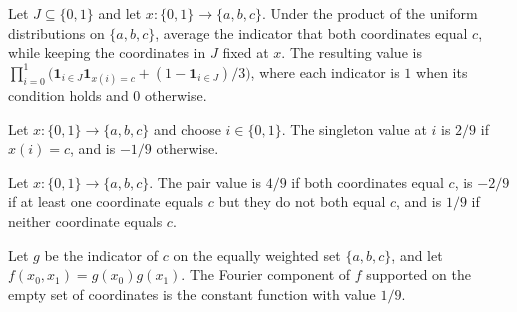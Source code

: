 \begin{theorem}
\label{FABL.projectOnCoordinates_threePointBothCIndicator}
\leanok
{}
Let $J\subseteq\{0,1\}$ and let $x:\{0,1\}\to\{a,b,c\}$. Under the product of the
uniform distributions on $\{a,b,c\}$, average the indicator that both coordinates equal
$c$, while keeping the coordinates in $J$ fixed at $x$. The resulting value is
$\prod_{i=0}^{1}\bigl(\mathbf{1}_{i\in J}\mathbf{1}_{x(i)=c}+(1-\mathbf{1}_{i\in
J})/3\bigr)$, where each indicator is $1$ when its condition holds and $0$ otherwise.
\end{theorem}

\begin{definition}
\label{FABL.threePointSingletonOrthogonalValue}
\leanok
{}
Let $x\colon\{0,1\}\to\{a,b,c\}$ and choose $i\in\{0,1\}$. The singleton value at $i$ is
$2/9$ if $x(i)=c$, and is $-1/9$ otherwise.
\end{definition}

\begin{definition}
\label{FABL.threePointPairOrthogonalValue}
\leanok
{}
Let $x\colon\{0,1\}\to\{a,b,c\}$. The pair value is $4/9$ if both coordinates equal $c$,
is $-2/9$ if at least one coordinate equals $c$ but they do not both equal $c$, and is
$1/9$ if neither coordinate equals $c$.
\end{definition}

\begin{theorem}
\label{FABL.threePointBothCIndicator_orthogonalComponent_empty}
\leanok
{}
Let $g$ be the indicator of $c$ on the equally weighted set $\{a,b,c\}$, and let
$f(x_0,x_1)=g(x_0)g(x_1)$. The Fourier component of $f$ supported on the empty set of
coordinates is the constant function with value $1/9$.
\end{theorem}

